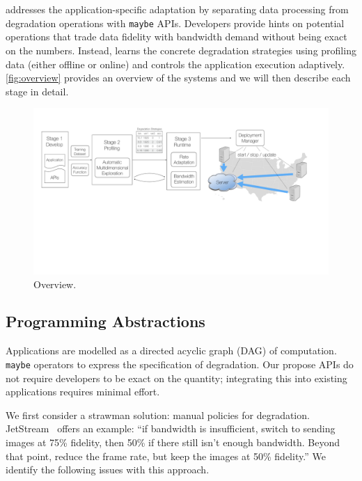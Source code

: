 \section{\sysname{}}
\label{sec:system}

\sysname{} addresses the application-specific adaptation by separating data
processing from degradation operations with \texttt{maybe} APIs. Developers
provide hints on potential operations that trade data fidelity with bandwidth
demand without being exact on the numbers. Instead, \sysname{} learns the
concrete degradation strategies using profiling data (either offline or online)
and controls the application execution adaptively. \autoref{fig:overview}
provides an overview of the systems and we will then describe each stage in
detail.

\begin{figure}
  \centering
  \includegraphics[width=.9\linewidth]{figures/system.pdf}
  \caption{\sysname{} Overview.}
  \label{fig:overview}
\end{figure}

\subsection{Programming Abstractions}
\label{sec:progr-abstr}

 Applications are modelled as a directed acyclic graph (DAG) of
computation.  \texttt{maybe} operators to express the specification of
degradation. Our propose APIs do not require developers to be exact on the
quantity; integrating this into existing applications requires minimal effort.

We first consider a strawman solution: manual policies for
degradation. JetStream~\cite{rabkin2014aggregation} offers an example: ``if
bandwidth is insufficient, switch to sending images at 75\% fidelity, then 50\%
if there still isn't enough bandwidth. Beyond that point, reduce the frame rate,
but keep the images at 50\% fidelity.'' We identify the following issues with
this approach.

